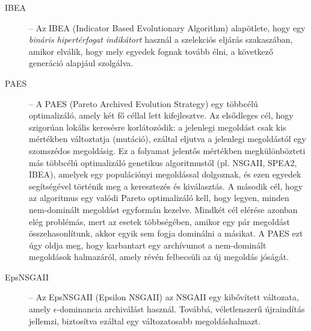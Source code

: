 \begin{description}
      \item[IBEA] -- Az IBEA (Indicator Based Evolutionary Algorithm) \cite{li2017modified} alapötlete, hogy egy \textit{bináris hipertérfogat indikátort} használ a szelekciós eljárás szakaszában,
            amikor elválik, hogy mely egyedek fognak tovább élni, a következő generáció alapjául szolgálva.
      \item[PAES] -- A PAES (Pareto Archived Evolution Strategy) \cite{knowles1999pareto} egy többcélú optimalizáló, amely két fő céllal lett kifejlesztve.
            Az elsődleges cél, hogy szigorúan lokális keresésre korlátozódik: a jelenlegi megoldást csak kis mértékben változtatja (mutáció),
            ezáltal eljutva a jelenlegi megoldástól egy szomszédos megoldásig. Ez a folyamat jelentős mértékben megkülönbözteti más többcélú optimalizáló genetikus algoritmustól (pl. NSGAII, SPEA2, IBEA),
            amelyek egy populációnyi megoldással dolgoznak, és ezen egyedek segítségével történik meg a keresztezés és kiválasztás.
            A második cél, hogy az algoritmus egy valódi Pareto optimalizáló kell, hogy legyen, minden nem-dominált megoldást egyformán kezelve.
            Mindkét cél elérése azonban elég problémás, mert az esetek többségében, amikor egy pár megoldást összehasonlítunk, akkor egyik sem fogja dominálni a másikat.
            A PAES ezt úgy oldja meg, hogy karbantart egy archívumot a nem-dominált megoldások halmazáról, amely révén felbecsüli az új megoldás jóságát.
      \item[EpsNSGAII] -- Az EpsNSGAII (Epsilon NSGAII) \cite{ventresca2018bi} az NSGAII egy kibővített változata, amely $\epsilon$-dominancia archiválást használ.
            Továbbá, véletlenszerű újraindítás jellemzi, biztosítva ezáltal egy változatosabb megoldáshalmazt.
\end{description}
